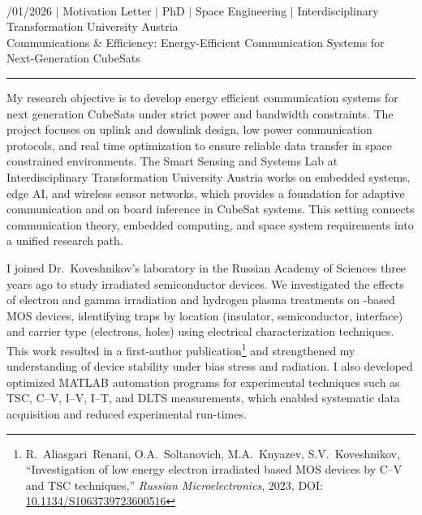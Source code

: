 \documentclass[a4paper,12pt]{article}
\begin{document}
{\centering
  {\scshape {}} \\ 
  {\fontsize{10}{10}/01/2026} $|$
  {\fontsize{10}{10}\selectfont Motivation Letter} $|$
  {\fontsize{10}{10}\selectfont PhD} $|$
  {\fontsize{10}{10}\selectfont Space Engineering} $|$
  {\fontsize{10}{10}\selectfont Interdisciplinary Transformation University Austria} \\
  {\fontsize{10}{10}\selectfont Communications \& Efficiency: Energy-Efficient Communication Systems for Next-Generation CubeSats}
\par}
\vspace{-15pt}
\noindent\rule{\textwidth}{0.5pt}

\vspace{-5pt}

My research objective is to develop energy efficient communication systems for next generation CubeSats under strict power and bandwidth constraints. The project focuses on uplink and downlink design, low power communication protocols, and real time optimization to ensure reliable data transfer in space constrained environments. The Smart Sensing and Systems Lab at Interdisciplinary Transformation University Austria works on embedded systems, edge AI, and wireless sensor networks, which provides a foundation for adaptive communication and on board inference in CubeSat systems. This setting connects communication theory, embedded computing, and space system requirements into a unified research path.

I joined Dr.\ Koveshnikov's laboratory in the Russian Academy of Sciences three years ago to study irradiated semiconductor devices. We investigated the effects of electron and gamma irradiation and hydrogen plasma treatments on -based MOS devices, identifying traps by location (insulator, semiconductor, interface) and carrier type (electrons, holes) using electrical characterization techniques. This work resulted in a first-author publication\footnote{R.~Aliasgari~Renani, O.A.~Soltanovich, M.A.~Knyazev, S.V.~Koveshnikov, ``Investigation of low energy electron irradiated  based MOS devices by C--V and TSC techniques,'' \textit{Russian Microelectronics}, 2023, DOI: \href{https://doi.org/10.1134/S1063739723600516}{10.1134/S1063739723600516}} and strengthened my understanding of device stability under bias stress and radiation. I also developed optimized MATLAB automation programs for experimental techniques such as TSC, C--V, I--V, I--T, and DLTS measurements, which enabled systematic data acquisition and reduced experimental run-times.
\end{document}
